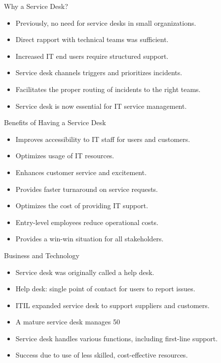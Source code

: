 \documentclass[aspectratio=169, table]{beamer}
\begin{document}
\begin{frame}{Why a Service Desk?}
	\begin{itemize}
		\item Previously, no need for service desks in small organizations.
		\item Direct rapport with technical teams was sufficient.
		\item Increased IT end users require structured support.
		\item Service desk channels triggers and prioritizes incidents.
		\item Facilitates the proper routing of incidents to the right teams.
		\item Service desk is now essential for IT service management.
	\end{itemize}
\end{frame}

\begin{frame}{Benefits of Having a Service Desk}
	\begin{itemize}
		\item Improves accessibility to IT staff for users and customers.
		\item Optimizes usage of IT resources.
		\item Enhances customer service and excitement.
		\item Provides faster turnaround on service requests.
		\item Optimizes the cost of providing IT support.
		\item Entry-level employees reduce operational costs.
		\item Provides a win-win situation for all stakeholders.
	\end{itemize}
\end{frame}

\begin{frame}{Business and Technology}
	\begin{itemize}
		\item Service desk was originally called a help desk.
		\item Help desk: single point of contact for users to report issues.
		\item ITIL expanded service desk to support suppliers and customers.
		\item A mature service desk manages 50%
		\item Service desk handles various functions, including first-line support.
		\item Success due to use of less skilled, cost-effective resources.
	\end{itemize}
\end{frame}
\end{document}
